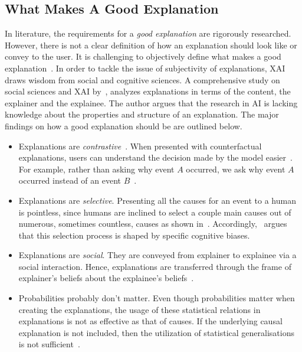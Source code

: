 \subsection{What Makes A Good Explanation}
\label{subsec:xai_aGoodExplanation}
In literature, the requirements for a \emph{good explanation} are rigorously researched. However, there is not a clear definition of how an explanation should look like or convey to the user. It is challenging to objectively define what makes a good explanation~\parencite{XAIConceptsTaxonomies_Arrieta}. In order to tackle the issue of subjectivity of explanations, XAI draws wisdom from social and cognitive sciences. A comprehensive study on social sciences and XAI by~\cite{ExplanationInAI_Miller}, analyzes explanations in terms of the content, the explainer and the explainee. The author argues that the research in AI is lacking knowledge about the properties and structure of an explanation.  The major findings on how a good explanation should be are outlined below.
\begin{itemize}
    \item Explanations are \emph{contrastive}~\parencite{ContrastiveExplanation_Lipton, XAI_BewareInmatesRunningTheAsylum_Miller}. When presented with counterfactual explanations, users can understand the decision made by the model easier~\parencite{ExplainableAndInterpretableModels_Escalante, MLCVPatternRecognition_Lopez, MLCVPatternRecognition_Lopez, CounterfactualsInXAI_Byrne}. For example, rather than asking why event $A$ occurred, we ask why event $A$ occurred instead of an event $B$~\parencite{ExplanationInAI_Miller,XAIConceptsTaxonomies_Arrieta}.
    \item Explanations are \emph{selective}. Presenting all the causes for an event to a human is pointless, since humans are inclined to select a couple main causes out of numerous, sometimes countless, causes as shown in~\parencite{ExplainingCollaborativeFiltering_Herlocker}. Accordingly,~\cite{ExplanationInAI_Miller} argues that this selection process is shaped by specific cognitive biases.
    \item Explanations are \emph{social}. They are conveyed from explainer to explainee via a social interaction. Hence, explanations are transferred through the frame of explainer's beliefs about the explainee's beliefs~\parencite{ExplanationInAI_Miller}.
    \item Probabilities probably don't matter. Even though probabilities matter when creating the explanations, the usage of these statistical relations in explanations is not as effective as that of causes. If the underlying causal explanation is not included, then the utilization of statistical generalisations is not sufficient~\parencite{ExplanationInAI_Miller}.
\end{itemize}
